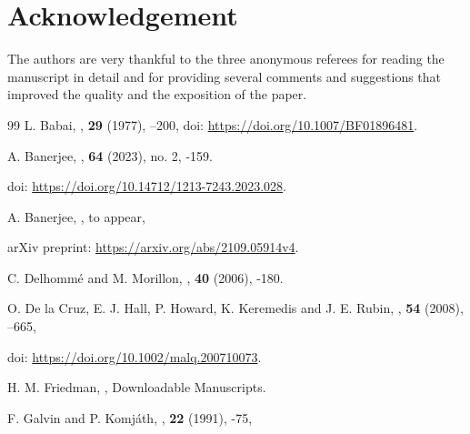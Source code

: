 \documentclass[12pt,reqno,a4paper]{amsart}
\theoremstyle{definition}
\begin{document}
	\section{Acknowledgement} The authors are very thankful to the three anonymous referees for reading the manuscript in detail and for providing several comments
	and suggestions that improved the quality and the exposition of the paper. 
	\begin{thebibliography}{99}
		L. Babai,
		,
		\newblock \textbf{29}
		\newblock (1977),
		–200,
		\newblock doi: \url{https://doi.org/10.1007/BF01896481}.
		
		 A. Banerjee,
		,
		\newblock \textbf{64}
		\newblock (2023),
		\newblock no. 2,
		-159.
		
		\newblock doi: \url{https://doi.org/10.14712/1213-7243.2023.028}.
		
		 A. Banerjee,
		,
		\newblock to appear,
		
		\newblock arXiv preprint: 
		\url{https://arxiv.org/abs/2109.05914v4}.
		
		C. Delhomm\'{e} and M. Morillon,
		,
		\newblock \textbf{40}
		\newblock (2006),
		-180.
		
		O. De la Cruz, E. J. Hall, P. Howard, K. Keremedis and J. E. Rubin,
		,
		\newblock \textbf{54}
		\newblock (2008),
		–665,
		
		\newblock doi: \url{  https://doi.org/10.1002/malq.200710073}.
		
		H. M. Friedman, 
		,
		\newblock Downloadable Manuscripts.
		
		F. Galvin and P. Komj\'{a}th,
		,
		\newblock \textbf{22} (1991),
		-75,
		

\end{thebibliography}
\end{document}
